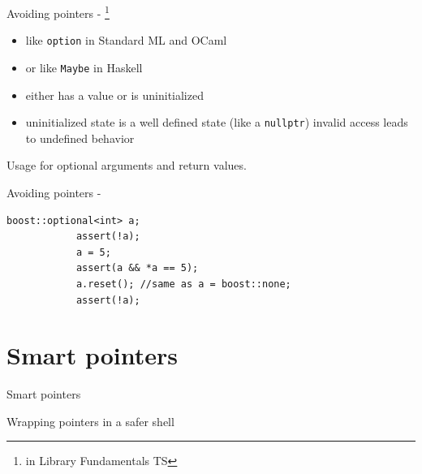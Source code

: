 	\begin{frame}{Avoiding pointers - }
		\footnote{ in Library Fundamentals TS}
		\begin{itemize}
			\item like \lstinline[morekeywords={option}]|option| in Standard ML and OCaml
			\item or like \lstinline[morekeywords={Maybe}]|Maybe| in Haskell
		\end{itemize}
		
		\begin{itemize}
			\item {} either has a value or is uninitialized
			\pause
			\item uninitialized state is a well defined state (like a \lstinline|nullptr|)
			      invalid access leads to undefined behavior
		\end{itemize}
		
		\pause
		
		\emptyline
		Usage for optional arguments and return values.
	\end{frame}
	
	\begin{frame}[fragile=singleslide]{Avoiding pointers - }
		\begin{lstlisting}[gobble=12]
			boost::optional<int> a;
			assert(!a);
			a = 5;
			assert(a && *a == 5);
			a.reset(); //same as a = boost::none;
			assert(!a);
		\end{lstlisting}
	\end{frame}
	
	\section{Smart pointers}
	\begin{frame}
		\begin{center}
			{\Huge Smart pointers}
			
			\emptyline
			{\Large Wrapping pointers in a safer shell}
		\end{center}
	\end{frame}
	
